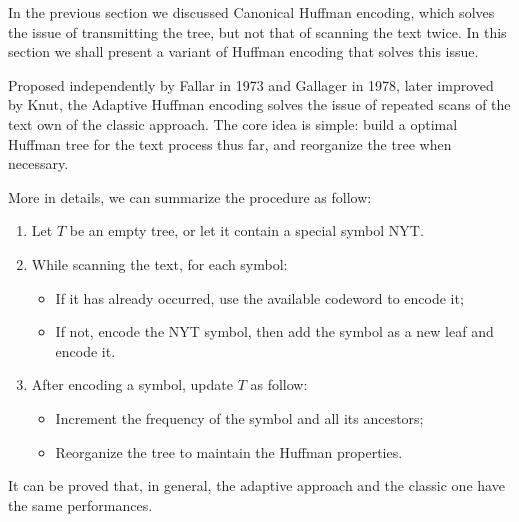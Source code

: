\documentclass{subfiles}
\begin{document}
    In the previous section we discussed Canonical Huffman encoding, 
        which solves the issue of transmitting the tree, 
        but not that of scanning the text twice.
        In this section we shall present a variant of Huffman encoding that 
        solves this issue.

    Proposed independently by Fallar in 1973 and Gallager in 1978,
        later improved by Knut, the Adaptive Huffman encoding
        solves the issue of repeated scans of the text own of the classic approach.
        The core idea is simple: build a optimal Huffman tree for the text 
        process thus far, and reorganize the tree when necessary.

    More in details, we can summarize the procedure as follow:
    \begin{enumerate}
        \item Let \(T\) be an empty tree, or let it contain a special symbol 
            NYT.
        \item While scanning the text, for each symbol:
            \begin{itemize}
                \item If it has already occurred, use the available codeword to encode it;
                \item If not, encode the NYT symbol, then add the symbol as a new leaf and encode it.
            \end{itemize}
        \item After encoding a symbol, update \(T\) as follow:
                \begin{itemize}
                    \item Increment the frequency of the symbol and all its ancestors;
                    \item Reorganize the tree to maintain the Huffman properties.
                \end{itemize}
    \end{enumerate}

    It can be proved that, in general,
        the adaptive approach and the classic one have the same performances.
\end{document}
